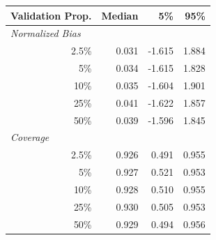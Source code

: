 
\begin{tabular}{r|rrr}
\toprule
Validation Prop. & Median & 5\% & 95\%\\
\midrule
\multicolumn{1}{l|}{\textit{Normalized Bias}}\\
2.5\% & 0.031 & -1.615 & 1.884\\
5\% & 0.034 & -1.615 & 1.828\\
10\% & 0.035 & -1.604 & 1.901\\
25\% & 0.041 & -1.622 & 1.857\\
50\% & 0.039 & -1.596 & 1.845\\
\midrule
%
\multicolumn{1}{l|}{\textit{Coverage}}\\
2.5\% & 0.926 & 0.491 & 0.955\\
5\% & 0.927 & 0.521 & 0.953\\
10\% & 0.928 & 0.510 & 0.955\\
25\% & 0.930 & 0.505 & 0.953\\
50\% & 0.929 & 0.494 & 0.956\\
\bottomrule
\end{tabular}
